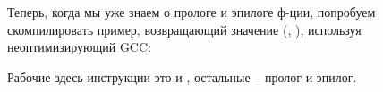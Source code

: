 
Теперь, когда мы уже знаем о прологе и эпилоге ф-ции, попробуем скомпилировать пример, возвращающий значение
(, ), используя неоптимизирующий GCC:



Рабочие здесь инструкции это  и , остальные -- пролог и эпилог.

